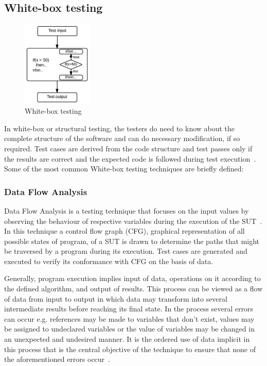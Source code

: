 \subsection{White-box testing}
\begin{figure}
  \vspace{-38pt}
  \begin{center}
    \includegraphics[width=0.30\textwidth]{chapter2/whiteBox.png}
  \end{center}
  \vspace{-20pt}
  \caption{White-box testing}
  \label{fig:whiteBox}
  \vspace{-20pt}
\end{figure}
In white-box or structural testing, the testers do need to know about the complete structure of the software and can do necessary modification, if so required. Test cases are derived from the code structure and test passes only if the results are correct and the expected code is followed during test execution~\cite{ostrand2002white}. Some of the most common White-box testing techniques are briefly defined:

\subsubsection{Data Flow Analysis}
Data Flow Analysis is a testing technique that focuses on the input values by observing the behaviour of respective variables during the execution of the SUT~\cite{clarke1989formal}. In this technique a control flow graph (CFG), graphical representation of all possible states of program, of a SUT is drawn to determine the paths that might be traversed by a program during its execution. Test cases are generated and executed to verify its conformance with CFG on the basis of data. 

Generally, program execution implies input of data, operations on it according to the defined algorithm, and output of results. This process can be viewed as a flow of data from input to output in which data may transform into several intermediate results before reaching its final state. In the process several errors can occur e.g. references may be made to variables that don’t exist, values may be assigned to undeclared variables or the value of variables may be changed in an unexpected and undesired manner. It is the ordered use of data implicit in this process that is the central objective of the technique to ensure that none of the aforementioned errors occur~\cite{fosdick1976data}.

